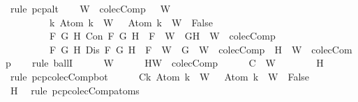 \begin{isabellebody}
%
\isadelimproof
%
\endisadelimproof
%
\isatagproof
{}\isamarkupfalse%
\ {\isacharparenleft}rule\ pcp{\isacharunderscore}alt{}{\isacharparenright}\isanewline
\ \ \isamarkupfalse%
\ {\isachardoublequoteopen}{\isasymforall}W\ {\isasymin}\ colecComp{\isachardot}\ {\isasymbottom}\ {\isasymnotin}\ W\isanewline
\ \ \ \ \ \ \ \ {\isasymand}\ {\isacharparenleft}{\isasymforall}k{\isachardot}\ Atom\ k\ {\isasymin}\ W\ {\isasymlongrightarrow}\ \isactrlbold {\isasymnot}\ {\isacharparenleft}Atom\ k{\isacharparenright}\ {\isasymin}\ W\ {\isasymlongrightarrow}\ False{\isacharparenright}\isanewline
\ \ \ \ \ \ \ \ {\isasymand}\ {\isacharparenleft}{\isasymforall}F\ G\ H{\isachardot}\ Con\ F\ G\ H\ {\isasymlongrightarrow}\ F\ {\isasymin}\ W\ {\isasymlongrightarrow}\ {\isacharbraceleft}G{\isacharcomma}H{\isacharbraceright}\ {\isasymunion}\ W\ {\isasymin}\ colecComp{\isacharparenright}\isanewline
\ \ \ \ \ \ \ \ {\isasymand}\ {\isacharparenleft}{\isasymforall}F\ G\ H{\isachardot}\ Dis\ F\ G\ H\ {\isasymlongrightarrow}\ F\ {\isasymin}\ W\ {\isasymlongrightarrow}\ {\isacharbraceleft}G{\isacharbraceright}\ {\isasymunion}\ W\ {\isasymin}\ colecComp\ {\isasymor}\ {\isacharbraceleft}H{\isacharbraceright}\ {\isasymunion}\ W\ {\isasymin}\ colecComp{\isacharparenright}{\isachardoublequoteclose}\isanewline
\ \ \isamarkupfalse%
\ {\isacharparenleft}rule\ ballI{\isacharparenright}\isanewline
\ \ \ \ \isamarkupfalse%
\ W\isanewline
\ \ \ \ \isamarkupfalse%
\ H{\isacharcolon}{\isachardoublequoteopen}W\ {\isasymin}\ colecComp{\isachardoublequoteclose}\isanewline
\ \ \ \ \isamarkupfalse%
\ C{}{\isacharcolon}{\isachardoublequoteopen}{\isasymbottom}\ {\isasymnotin}\ W{\isachardoublequoteclose}\isanewline
\ \ \ \ \ \ \isamarkupfalse%
\ H\ \isamarkupfalse%
\ {\isacharparenleft}rule\ pcp{\isacharunderscore}colecComp{\isacharunderscore}bot{\isacharparenright}\isanewline
\ \ \ \ \isamarkupfalse%
\ C{}{\isacharcolon}{\isachardoublequoteopen}{\isasymforall}k{\isachardot}\ Atom\ k\ {\isasymin}\ W\ {\isasymlongrightarrow}\ \isactrlbold {\isasymnot}\ {\isacharparenleft}Atom\ k{\isacharparenright}\ {\isasymin}\ W\ {\isasymlongrightarrow}\ False{\isachardoublequoteclose}\isanewline
\ \ \ \ \ \ \isamarkupfalse%
\ H\ \isamarkupfalse%
\ {\isacharparenleft}rule\ pcp{\isacharunderscore}colecComp{\isacharunderscore}atoms{\isacharparenright}\isanewline
\ \ \ \ \isamarkupfalse%

\end{isabellebody}
